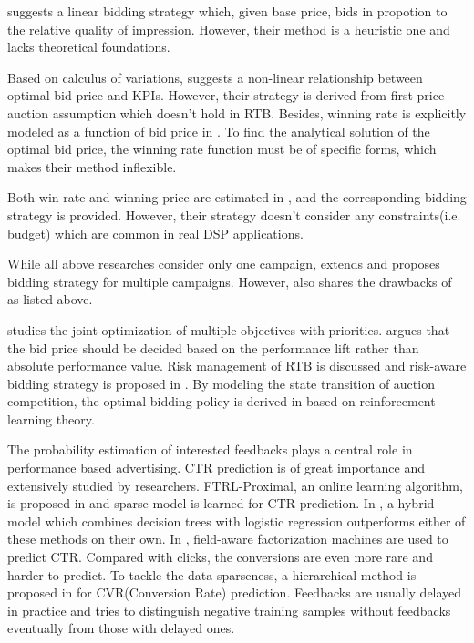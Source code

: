 \documentclass[sigconf]{acmart}
\begin{document}
\cite{M6D} suggests a linear bidding strategy which, given base price,
    bids in propotion to the relative quality of impression.
However, their method is a heuristic one and lacks theoretical foundations.

Based on calculus of variations, \cite{WeinanZhang2014} suggests a non-linear relationship between optimal bid price and KPIs.
However, their strategy is derived from first price auction assumption which doesn't hold in RTB.
Besides, winning rate is explicitly modeled as a function of bid price in \cite{WeinanZhang2014}.
To find the analytical solution of the optimal bid price,
    the winning rate function must be of specific forms,
    which makes their method inflexible.

Both win rate and winning price are estimated in \cite{XiangLi2014}, and the corresponding bidding strategy is provided.
However, their strategy doesn't consider any constraints(i.e. budget) which are common in real DSP applications.

While all above researches consider only one campaign,
    \cite{WeinanZhang2015} extends \cite{WeinanZhang2014} and proposes bidding strategy for multiple campaigns.
However, \cite{WeinanZhang2015} also shares the drawbacks of \cite{WeinanZhang2014} as listed above.

\cite{Joint2016} studies the joint optimization of multiple objectives with priorities.
\cite{Lift2016} argues that the bid price should be decided
    based on the performance lift rather than absolute performance value.
Risk management of RTB is discussed and risk-aware bidding strategy is proposed in \cite{Risk2017}.
By modeling the state transition of auction competition,
    the optimal bidding policy is derived in \cite{Reinforce2017} based on reinforcement learning theory.

The probability estimation of interested feedbacks plays a central role in performance based advertising.
CTR prediction is of great importance and extensively studied by researchers.
FTRL-Proximal, an online learning algorithm, is proposed in \cite{Google2013} and sparse model is learned for CTR prediction.
In \cite{Facebook2014}, a hybrid model which combines decision trees with logistic regression
    outperforms either of these methods on their own.
In \cite{FFM2016}, field-aware factorization machines are used to predict CTR.
Compared with clicks, the conversions are even more rare and harder to predict.
To tackle the data sparseness, a hierarchical method is proposed in \cite{CVR} for CVR(Conversion Rate) prediction.
Feedbacks are usually delayed in practice and \cite{DelayedFeedback} tries to
    distinguish negative training samples without feedbacks eventually from those with delayed ones.
\end{document}
